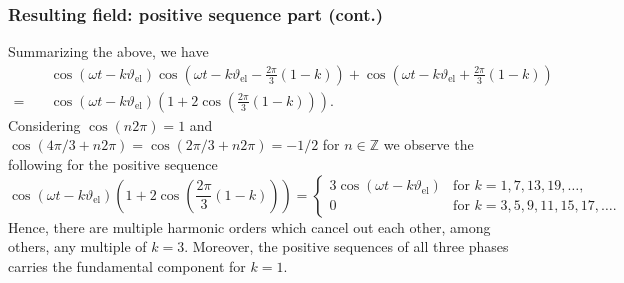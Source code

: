 \begin{frame}
	\frametitle{Resulting field: positive sequence part (cont.)}
	\onslide<+->
	Summarizing the above, we have
	\begin{align*}
		        & \cos(\omega t - k \vartheta_\mathrm{el})  \cos(\omega t - k \vartheta_\mathrm{el} - \frac{2\pi}{3}(1-k)) + \cos(\omega t - k \vartheta_\mathrm{el} + \frac{2\pi}{3}(1-k)) \\
		= \quad & \cos(\omega t - k \vartheta_\mathrm{el})(1+2\cos(\frac{2\pi}{3}(1-k))).
	\end{align*}
	\onslide<+->
	Considering $\cos(n 2 \pi)=1$ and $\cos(4\pi/3 + n 2 \pi) = \cos(2\pi/3 + n 2 \pi)=-1/2$ for $n \in \mathbb{Z}$ we observe the following for the positive sequence
	\begin{equation}
		\cos(\omega t - k \vartheta_\mathrm{el})(1+2\cos(\frac{2\pi}{3}(1-k))) = \begin{cases}
			3 \cos(\omega t - k \vartheta_\mathrm{el}) & \text{for } k=1,7,13,19,\ldots,       \\
			0                                          & \text{for } k=3,5,9,11,15, 17,\ldots.
		\end{cases}
	\end{equation}
	\onslide<+->
	Hence, there are multiple harmonic orders which cancel out each other, among others, any multiple of $k=3$. Moreover, the positive sequences of all three phases carries the fundamental component for $k=1$.
\end{frame}

